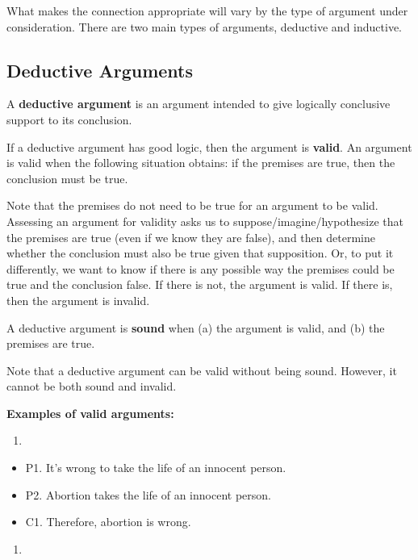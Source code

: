 \documentclass[]{article}
\providecommand{\tightlist}{%
  \setlength{\itemsep}{0pt}\setlength{\parskip}{0pt}}
\begin{document}
What makes the connection appropriate will vary by the type of argument
under consideration. There are two main types of arguments, deductive
and inductive.

\subsection{Deductive Arguments}\label{deductive-arguments}

A \textbf{deductive argument} is an argument intended to give logically
conclusive support to its conclusion.

If a deductive argument has good logic, then the argument is
\textbf{valid}. An argument is valid when the following situation
obtains: if the premises are true, then the conclusion must be true.

Note that the premises do not need to be true for an argument to be
valid. Assessing an argument for validity asks us to
suppose/imagine/hypothesize that the premises are true (even if we know
they are false), and then determine whether the conclusion must also be
true given that supposition. Or, to put it differently, we want to know
if there is any possible way the premises could be true and the
conclusion false. If there is not, the argument is valid. If there is,
then the argument is invalid.

A deductive argument is \textbf{sound} when (a) the argument is valid,
and (b) the premises are true.

Note that a deductive argument can be valid without being sound.
However, it cannot be both sound and invalid.

\textbf{Examples of valid arguments:}

\begin{enumerate}
\def\labelenumi{\arabic{enumi})}
\item
\end{enumerate}

\begin{itemize}
\tightlist
\item
  P1. It's wrong to take the life of an innocent person.
\item
  P2. Abortion takes the life of an innocent person.
\item
  C1. Therefore, abortion is wrong.
\end{itemize}

\begin{enumerate}
\def\labelenumi{\arabic{enumi})}
\setcounter{enumi}{1}
\item
\end{enumerate}
\end{document}

